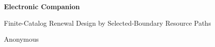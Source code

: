 \documentclass[11pt,letterpaper]{article}
\theoremstyle{definition}\newtheorem{remark}[theorem]{Remark}
\begin{document}
\begin{center}{\Large\bfseries Electronic Companion}\par\vspace{6pt}
Finite-Catalog Renewal Design by Selected-Boundary Resource Paths\par Anonymous\end{center}

\clearpage
\clearpage
\clearpage
\end{document}
